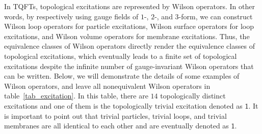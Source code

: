 \documentclass[11pt,nofootinbib,preprint]{revtex4-1}
\begin{document}
In TQFTs, topological excitations  are represented by Wilson operators. In other words, by respectively using gauge fields of $1$-, $2$-, and $3$-form, we can construct Wilson loop operators for particle excitations, Wilson surface operators for loop excitations, and  Wilson volume operators for membrane excitations. Thus,   the equivalence classes of Wilson operators directly render the equivalence classes of topological excitations, which eventually leads to a finite set of topological excitations despite the infinite number of gauge-invariant Wilson operators that can be written.  Below, we will demonstrate the details of some examples of  Wilson operators, and leave all nonequivalent Wilson operators in table~\ref{tab_excitation}. In this table, there are $14$ topologically distinct excitations and one of them is the topologically trivial excitation denoted as $\mathsf{1}$.  It is important to point out that trivial particles, trivial loops, and trivial membranes are all identical to each other and are eventually denoted as $\mathsf{1}$. 
\end{document}
